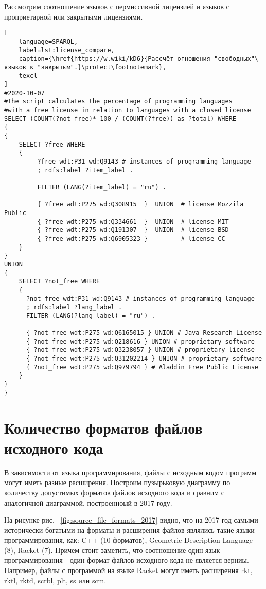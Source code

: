 Рассмотрим соотношение языков с пермиссивной лицензией и языков с проприетарной или закрытыми лицензиями.
\begin{lstlisting}[
	language=SPARQL,
	label=lst:license_compare,
	caption={\href{https://w.wiki/kD6}{Рассчёт отношения "свободных"\ языков к "закрытым".}\protect\footnotemark},
	texcl
]
#2020-10-07
#The script calculates the percentage of programming languages 
#with a free license in relation to languages with a closed license
SELECT (COUNT(?not_free)* 100 / (COUNT(?free)) as ?total) WHERE
{ 
{
    SELECT ?free WHERE 
    {
         ?free wdt:P31 wd:Q9143 # instances of programming language
         ; rdfs:label ?item_label . 

         FILTER (LANG(?item_label) = "ru") . 
  
         { ?free wdt:P275 wd:Q308915  }  UNION  # license Mozzila Public
         { ?free wdt:P275 wd:Q334661  }  UNION  # license MIT
         { ?free wdt:P275 wd:Q191307  }  UNION  # license BSD
         { ?free wdt:P275 wd:Q6905323 }         # license CC
    }
}
UNION
{
    SELECT ?not_free WHERE 
    {
      ?not_free wdt:P31 wd:Q9143 # instances of programming language
      ; rdfs:label ?lang_label . 
      FILTER (LANG(?lang_label) = "ru") .
  
      { ?not_free wdt:P275 wd:Q6165015 } UNION # Java Research License
      { ?not_free wdt:P275 wd:Q218616 } UNION # proprietary software
      { ?not_free wdt:P275 wd:Q3238057 } UNION # proprietary license 
      { ?not_free wdt:P275 wd:Q31202214 } UNION # proprietary software 
      { ?not_free wdt:P275 wd:Q979794 } # Aladdin Free Public License
    }
}
}
\end{lstlisting}

\section{Количество форматов файлов исходного кода}
В зависимости от языка программирования, файлы с исходным кодом программ могут иметь разные расширения. Построим пузырьковую диаграмму по количеству допустимых форматов файлов исходного кода и сравним с аналогичной диаграммой, построенноый в 2017 году.

На рисунке рис. ~\ref{fig:source_file_formats_2017} видно, что на 2017 год самыми исторически богатыми на форматы и расширения файлов являлись такие языки программирования, как: C++ (10 форматов), Geometric Description Language (8), Racket (7). Причем стоит заметить, что соотношение один язык программирования - один формат файлов исходного кода не является верниы. Например, файлы с программой на языке Racket могут иметь расширения rkt, rktl, rktd, scrbl, plt, ss или scm.

